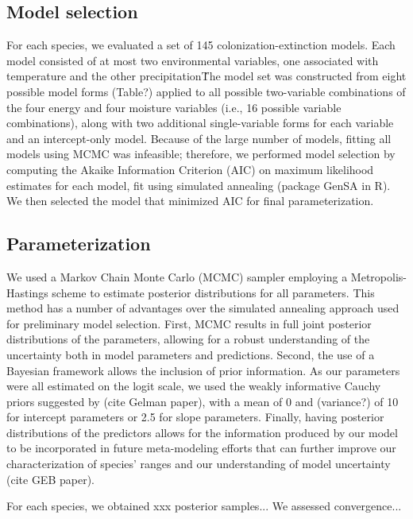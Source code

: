 \documentclass[11pt]{article}
\begin{document}
\subsection*{Model selection}
For each species, we evaluated a set of 145 colonization-extinction models. 
Each model consisted of at most two environmental variables, one associated with temperature and the other precipitation\. 
The model set was constructed from eight possible model forms (Table?) applied to all possible two-variable combinations of the four energy and four moisture variables (i.e., 16 possible variable combinations), along with two additional single-variable forms for each variable and an intercept-only model. 
Because of the large number of models, fitting all models using MCMC was infeasible; therefore, we performed model selection by computing the Akaike Information Criterion (AIC) on maximum likelihood estimates for each model, fit using simulated annealing (package GenSA in R). 
We then selected the model that minimized AIC for final parameterization.

\subsection*{Parameterization}
We used a Markov Chain Monte Carlo (MCMC) sampler employing a Metropolis-Hastings scheme to estimate posterior distributions for all parameters.
This method has a number of advantages over the simulated annealing approach used for preliminary model selection.
First, MCMC results in full joint posterior distributions of the parameters, allowing for a robust understanding of the uncertainty both in model parameters and predictions.
Second, the use of a Bayesian framework allows the inclusion of prior information.
As our parameters were all estimated on the logit scale, we used the weakly informative Cauchy priors suggested by (cite Gelman paper), with a mean of 0 and (variance?) of 10 for intercept parameters or 2.5 for slope parameters.
Finally, having posterior distributions of the predictors allows for the information produced by our model to be incorporated in future meta-modeling efforts that can further improve our characterization of species' ranges and our understanding of model uncertainty (cite GEB paper).

For each species, we obtained xxx posterior samples...
We assessed convergence...

\end{document}

